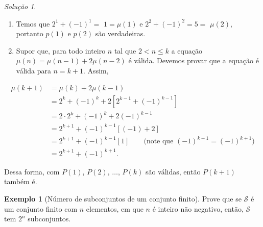 \documentclass[]{book}
\theoremstyle{definition}
\theoremstyle{definition}
\newtheorem{example}{Exemplo}[chapter]
\theoremstyle{definition}
\theoremstyle{remark}
\newtheorem*{solution}{Solução}
\begin{document}
\begin{solution}
\iffalse{} {Solução. } \fi{}

\begin{enumerate}
\def\labelenumi{\roman{enumi}.}
\item
  Temos que \(2^1 + (-1)^1 =\) \(1 = \mu(1)\) e \(2^2+(-1)^2=5=\) \(\mu(2),\) portanto \(p(1)\) e \(p(2)\) são verdadeiras.
\item
  Supor que, para todo inteiro \(n\) tal que \(2 < n \leq k\) a equação \(\mu(n) = \mu(n-1) + 2\mu(n-2)\) é válida.
  Devemos provar que a equação é válida para \(n=k+1\).
  Assim,
\end{enumerate}

\begin{align}
\mu(k+1) &= \mu(k) + 2\mu(k-1)\\
&= 2^k + (-1)^k + 2[2^{k-1} + (-1)^{k-1}]\\
&= 2\cdot 2^k + (-1)^k + 2(-1)^{k-1}\\
&= 2^{k+1} + (-1)^{k-1}[(-1)+2]\\
&= 2^{k+1} + (-1)^{k-1}[1] \qquad{\text{(note que $(-1)^{k-1}=(-1)^{k+1}$})}\\
&= 2^{k+1} + (-1)^{k+1}.
\end{align}

Dessa forma, com \(P(1)\), \(P(2)\), \(\ldots\), \(P(k)\) são válidas, então \(P(k+1)\) também é.
\end{solution}

\begin{example}[Número de subconjuntos de um conjunto finito]
\protect\hypertarget{exm:unnamed-chunk-38}{}{\label{exm:unnamed-chunk-38} \iffalse (Número de subconjuntos de um conjunto finito) \fi{} }Prove que se \(\mathcal{S}\) é um conjunto finito com \(n\) elementos, em que \(n\) é inteiro não negativo, então, \(\mathcal{S}\) tem \(2^n\) subconjuntos.
\end{example}
\end{document}

